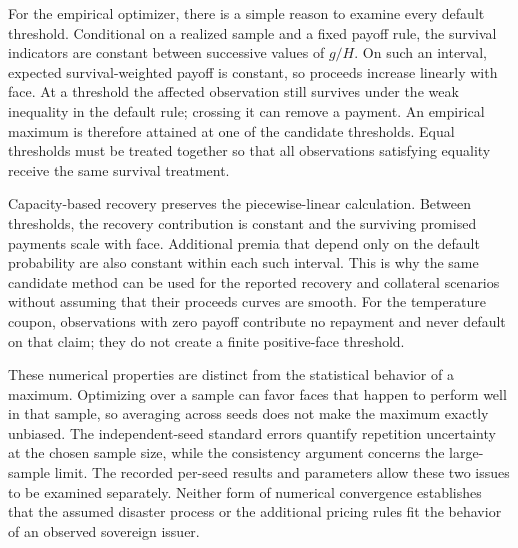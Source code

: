 For the empirical optimizer, there is a simple reason to examine every default threshold. Conditional on a realized sample and a fixed payoff rule, the survival indicators are constant between successive values of $g/H$. On such an interval, expected survival-weighted payoff is constant, so proceeds increase linearly with face. At a threshold the affected observation still survives under the weak inequality in the default rule; crossing it can remove a payment. An empirical maximum is therefore attained at one of the candidate thresholds. Equal thresholds must be treated together so that all observations satisfying equality receive the same survival treatment.

Capacity-based recovery preserves the piecewise-linear calculation. Between thresholds, the recovery contribution is constant and the surviving promised payments scale with face. Additional premia that depend only on the default probability are also constant within each such interval. This is why the same candidate method can be used for the reported recovery and collateral scenarios without assuming that their proceeds curves are smooth. For the temperature coupon, observations with zero payoff contribute no repayment and never default on that claim; they do not create a finite positive-face threshold.

These numerical properties are distinct from the statistical behavior of a maximum. Optimizing over a sample can favor faces that happen to perform well in that sample, so averaging across seeds does not make the maximum exactly unbiased. The independent-seed standard errors quantify repetition uncertainty at the chosen sample size, while the consistency argument concerns the large-sample limit. The recorded per-seed results and parameters allow these two issues to be examined separately. Neither form of numerical convergence establishes that the assumed disaster process or the additional pricing rules fit the behavior of an observed sovereign issuer.
